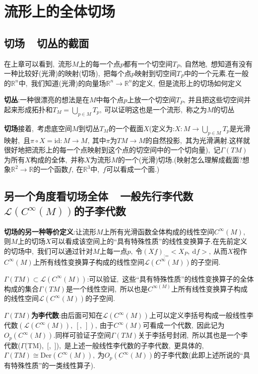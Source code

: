\section{流形上的全体切场}
\subsection{切场\ \raisebox{0.5mm}{------}\ 切丛的截面}
在上章可以看到,\ 流形$M$上的每一个点$p$都有一个切空间$T_P,\ $自然地,\ 想知道有没有一种比较好(光滑)的映射(切场),\ 把每个点$p$映射到切空间$T_P$中的一个元素.在一般的$\mathbb{R}^n$中,\ 我们知道(光滑)的向量场$\mathbb{R}^n\rightarrow\mathbb{R}^n$的定义,\ 但是流形上的切场如何定义

\textbf{切丛}:一种很漂亮的想法是在$M$中每个点$p$上放一个切空间$T_P,\ $并且把这些切空间并起来形成拓扑和$T_M=\bigcup\limits_{p\in M}T_p,\ $可以证明这也是一个流形,\ 称之为$M$的切丛

\textbf{切场}接着,\ 考虑底空间$M$到切丛$T_M$的一个截面$X$(定义为:$X:M\rightarrow\bigcup_{p\in M}T_p$是光滑映射,\ 且$\pi\circ X=\text{id}:M\rightarrow M,\ $其中$\pi$为$TM\rightarrow M$的自然投影,\ 其为光滑满射.这样就很好地把流形上的每一个点映射到这个点的切空间中的一个切向量),\ 记$\Gamma(TM)$为所有$X$构成的全体,\ 并称$X$为流形$M$的一个(光滑)切场.(映射怎么理解成截面?想象$\mathbb{R}^2\rightarrow\mathbb{R}$的一个函数$f,\ $在$\mathbb{R}^3$中,\ $f$可以看成一个面.)

\subsection{另一个角度看切场全体\ \raisebox{0.5mm}{------}\ 一般先行李代数$\mathcal{L}(C^{\infty}(M))$的子李代数}
\textbf{切场的另一种等价定义}:让流形$M$上所有光滑函数全体构成的线性空间$C^{\infty}(M),\ $则$M$上的切场$X$可以看成该空间上的“具有特殊性质”的线性变换算子.在先前定义的切场中,\ 我们可以通过针对$M$上每一点$p,\ $令$(Xf)_:=<X_P,\ \text{d}f>,\ $从而$X$视作$C^{\infty}(M)$上所有线性变换算子构成的线性空间$\mathcal{L}(C^{\infty}(M))$的子空间.

\textbf{$\Gamma(TM)\subset\mathcal{L}(C^{\infty}(M))$}:可以验证,\ 这些“具有特殊性质”的线性变换算子的全体构成的集合$\Gamma(TM)$是一个线性空间,\ 所以也是$C^{\infty(M)}$上所有线性变换算子构成的线性空间$\mathcal{L}(C^{\infty}(M))$的子空间.

\textbf{$\Gamma(TM)$为李代数}:由后面可知在$\mathcal{L}(C^{\infty}(M))$上可以定义李括号构成一般线性李代数$\left(\mathcal{L}(C^{\infty}(M)),\ [,\ ]\right),\ $由于$C^{\infty}(M)$可看成一个代数,\ 因此记为$O_p(C^{\infty}(M)).$同样可验证子空间$\Gamma(TM)$关于李括号封闭,\ 所以其也是一个李代数($\Gamma$(TM),\ [,\ ]),\ 是上述一般线性李代数的子李代数,\ 更具体的,\ $\Gamma(TM)\cong\mathrm{Der}(C^{\infty}(M)),\ $为$O_p(C^{\infty}(M))$的子李代数(此即上述所说的“具有特殊性质”的一类线性算子).

